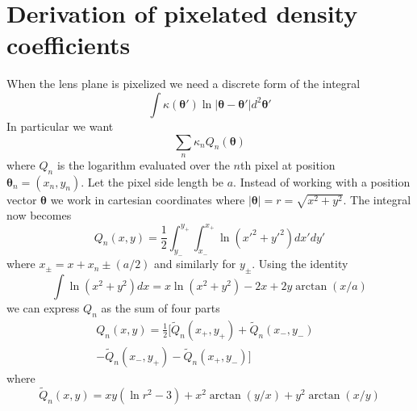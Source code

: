 \documentclass[galley,usenatbib]{mn2e}
\renewcommand{\vec}[1]{\ensuremath{\boldsymbol{#1}}}
\begin{document}
\section{Derivation of pixelated density coefficients}
\label{Q derivation}
When the lens plane is pixelized we need a discrete form of the integral
%
\[\int \kappa(\vec\theta') \ln |\vec\theta-\vec\theta'| d^2\vec\theta' \]
%
In particular we want
%
\[\sum_n \kappa_n Q_n(\vec\theta)\]
%
where $Q_n$ is the logarithm evaluated over the $n$th pixel at position $\vec\theta_n = (x_n, y_n)$. Let the pixel side length be $a$.
Instead of working with a position vector $\vec\theta$ we work in cartesian coordinates where 
%
$|\vec\theta| = r = \sqrt{x^2 + y^2}$. The integral now becomes
%
\[Q_n(x,y) = \frac12 \int_{y_-}^{y_+}\int_{x_-}^{x_+} \ln (x'^2+y'^2) dx' dy'\]
%
where $x_\pm = x + x_n \pm (a/2)$ and similarly for $y_\pm$.
Using the identity
%
\[\int \ln(x^2+y^2) dx = x \ln(x^2+y^2) - 2x + 2y\arctan(x/a) \]
%
we can express $Q_n$ as the sum of four parts
%
\begin{align*}
Q_n(x,y) = \frac12 [\tilde Q_n(x_+,y_+)
                  + \tilde Q_n(x_-,y_-) & 
\\                - \tilde Q_n(x_-,y_+)
                  - \tilde Q_n(x_+,y_-) ]
\end{align*}
%
where
%
\[\tilde Q_n(x,y) = xy(\ln r^2 - 3) + x^2\arctan(y/x) + y^2\arctan(x/y)\]
\end{document}
